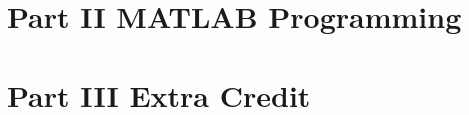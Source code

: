 \documentclass{article}[12 pt]
\begin{document}
\section*{Part II MATLAB Programming}

\section*{Part III Extra Credit}







\end{document}
